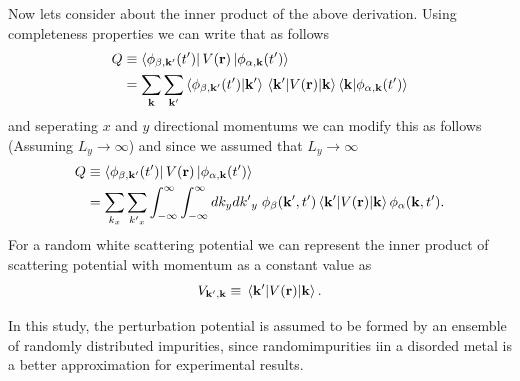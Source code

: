 \noindent
Now lets consider about the inner product of the above derivation. Using completeness properties we can write that as follows
\begin{equation} \label{4.23}
  \begin{aligned}
    Q & \equiv
    \bra{\phi_{\beta,\mathbf{k'}}(t')}
    V(\mathbf{r}) \ket{\phi_{\alpha,\mathbf{k}}(t')} \\
    & =
    \sum_{\mathbf{k}}\sum_{\mathbf{k'}}
    \braket{\phi_{\beta,\mathbf{k'}}(t')}{\mathbf{k'}}
    \mel{\mathbf{k'}}{V(\mathbf{r})}{\mathbf{k}}
    \braket{\mathbf{k}}{\phi_{\alpha,\mathbf{k}}(t')}
  \end{aligned}
\end{equation}
and seperating $x$ and $y$ directional momentums we can modify this as follows (Assuming $L_y \rightarrow \infty$) and since we assumed that $L_y \rightarrow \infty$
\begin{equation} \label{4.24}
  \begin{aligned}
    Q & \equiv
    \bra{\phi_{\beta,\mathbf{k'}}(t')}
    V(\mathbf{r}) \ket{\phi_{\alpha,\mathbf{k}}(t')} \\
    & =
    \sum_{k_x}\sum_{{k'}_x}
    \int_{-\infty}^{\infty} \int_{-\infty}^{\infty} dk_y d{k'}_y \;
    \phi_{\beta}(\mathbf{k'},t')
    \mel{\mathbf{k'}}{V(\mathbf{r})}{\mathbf{k}}
    \phi_{\alpha}(\mathbf{k},t').
  \end{aligned}
\end{equation}
For a random white scattering potential we can represent the inner product of scattering potential with momentum as a constant value as
\begin{equation} \label{4.25}
  V_{\mathbf{k'},\mathbf{k}} \equiv \mel{\mathbf{k'}}{V(\mathbf{r})}{\mathbf{k}}.
\end{equation}

\noindent
In this study, the perturbation potential is assumed to be formed by an ensemble of randomly distributed impurities, since randomimpurities iin a disorded metal is a better approximation for experimental results.

